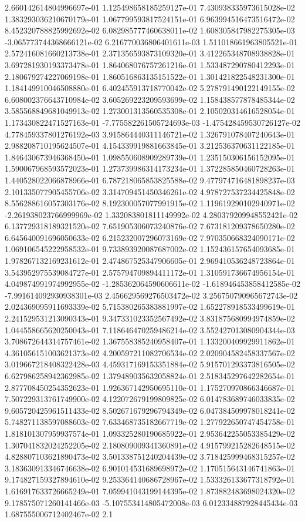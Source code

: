 2.660142614804996697e-01	1.125498658185259127e-01	7.430938335973615028e-02	1.383293036210670179e-01	1.067799593817524151e-01	6.963994516473516472e-02	8.452320788825992692e-02	6.082985777460638011e-02	1.608305847982275305e-03	-3.065773744368666121e-02	6.216770036806401611e-03	1.511018661963805521e-01	2.572416081660213738e-01	2.371356593873109320e-01	3.412265348708938828e-01	3.697281930193373478e-01	1.864068076757261216e-01	1.533487290780412293e-01	2.180679274227069198e-01	1.860516863135151522e-01	1.301421822548231300e-01	1.184149910046508880e-01	6.402455913718770042e-02	5.278791490122149155e-02	6.608002376643710984e-02	3.605269223209593699e-02	1.158438577878485344e-02	3.585568849681049913e-02	1.273001313560535308e-01	2.105020314616528054e-01	1.173430822471527163e-01	-7.775582261505724693e-03	-1.475428459530726127e-02	4.778459337801276192e-03	3.915864440311146721e-02	1.326791078407240643e-01	2.988208710195624507e-01	4.154339919881663845e-01	3.212536370631122185e-01	1.846430673946368450e-01	1.098550608909289739e-01	1.235150306156152095e-01	1.590067968593572023e-01	1.273739986314173234e-01	1.372285850460728263e-01	1.440528022066878966e-01	6.787218065853825588e-02	9.477974716481898237e-03	2.101335077905455706e-02	3.314709451450346261e-02	4.978727537234425848e-02	8.556288616057303176e-02	8.192300057077991915e-02	1.119619290102940971e-02	-2.261938023766999969e-02	1.332083801811149992e-02	4.280379209948552421e-02	6.137729318189321520e-02	7.651905306073240876e-02	7.673181209378650280e-02	6.645640091696050633e-02	6.215232007296073169e-02	7.970350668324090171e-02	1.069106545222958532e-01	9.733893920087687002e-02	1.152436157654093685e-01	1.978267132169231612e-01	2.474867525347906605e-01	2.969410536248723864e-01	3.543952975539084727e-01	2.575794709894411172e-01	1.310591736674956154e-01	4.049874991974992955e-02	-1.285362064590606611e-02	-1.618946453858412585e-02	-7.991614092930938301e-03	2.456629569276503472e-02	3.256750790965672743e-02	2.024369095911693339e-02	5.715380265383881997e-02	1.652278918533499619e-01	2.241529531213090343e-01	9.347331023352567492e-02	3.831875680994974859e-02	1.044558665620250043e-01	7.118646470259486214e-02	3.552427013080904344e-03	3.708672644314757461e-02	1.367558385240958407e-01	1.133200409929911862e-01	4.361056151003621373e-02	4.200597211082706534e-02	2.020904582458337567e-02	3.019667218408322428e-03	4.459317169153351884e-02	5.915701293373816505e-02	6.627986258942362985e-02	1.379489035632058824e-01	2.518345297642282654e-01	2.877708450254352623e-01	1.926367142950695110e-01	1.175270970866346687e-01	7.507229313761749900e-02	4.122072679199809825e-02	6.014783689746033835e-02	9.605720425961511433e-02	8.502671679296794349e-02	6.047384509978018241e-02	5.748271138597088603e-02	7.633468735182667719e-02	1.277922650747454758e-01	1.818101307959937574e-01	1.093325280190685922e-01	2.953642255053385429e-02	1.307041832024252205e-02	2.180809009341360891e-02	4.915799215282648515e-02	4.828807103621890473e-02	3.501338751240204439e-02	3.718425999468315257e-02	3.183630913346746638e-02	6.901014531689698972e-02	1.170515643146741863e-01	9.174827159327894610e-02	9.253364140686728967e-02	1.533326133677318792e-01	1.616917633726665249e-01	7.059941043199144395e-02	1.873882483698024320e-02	9.178575071260141466e-03	-5.107553414805472008e-03	6.012334887928445434e-03	1.687555006712402467e-02	2.1